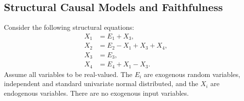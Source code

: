 \subsection{Structural Causal Models and Faithfulness}

Consider the following structural equations:
\begin{align*}
  X_1 & = E_1 + X_3, \\
  X_2 & = E_2 - X_1 + X_3 + X_4, \\ 
  X_3 & = E_3,  \\
  X_4 & = E_4 + X_1 - X_3. 
\end{align*}
Assume all variables to be real-valued.
The $E_i$ are exogenous random variables, independent and standard univariate normal distributed, and the $X_i$ are endogenous variables.
There are no exogenous input variables.
